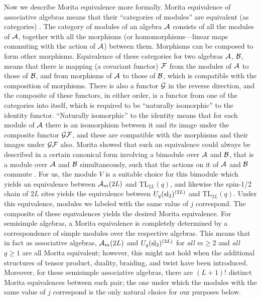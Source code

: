 \documentclass[twocolumn,floats,pra]{revtex4}
\def \cA {{\cal A}}
\begin{document}
Now we describe Morita equivalence more formally. Morita
equivalence of associative algebras means that their ``categories
of modules'' are equivalent (as categories) \cite{anf}. The
category of modules of an algebra $\cA$ consists of all the
modules of $\cA$, together with all the morphisms (or
homomorphisms---linear maps commuting with the action of $\cA$)
between them. Morphisms can be composed to form other morphisms.
Equivalence of these categories for two algebras $\cA$, ${\cal
B}$, means that there is mapping (a covariant functor) ${\cal F}$
from the modules of $\cA$ to those of $\cal B$, and from morphisms
of $\cA$ to those of $\cal B$, which is compatible with the
composition of morphisms. There is also a functor $\cal G$ in the
reverse direction, and the composite of these functors, in either
order, is a functor from one of the categories into itself, which
is required to be ``naturally isomorphic'' to the identity
functor. ``Naturally isomorphic'' to the identity means that for
each module of $\cA$ there is an isomorphism between it and its
image under the composite functor ${\cal G}{\cal F}$, and these
are compatible with the morphisms and their images under ${\cal
G}{\cal F}$ also. Morita showed that such an equivalence could
always be described in a certain canonical form involving a
bimodule over $\cA$ and $\cal B$, that is a module over $\cA$ and
$\cal B$ simultaneously, such that the actions on it of $\cA$ and
$\cal B$ commute \cite{anf}. For us, the module $V$ is a suitable
choice for this bimodule which yields an equivalence between
$\cA_m(2L)$ and TL$_{2L}(q)$, and likewise the spin-1/2 chain of
$2L$ sites yields the equivalence between $U_q({\rm sl}_2)^{(2L)}$
and TL$_{2L}(q)$. Under this equivalence, modules we labeled with
the same value of $j$ correspond. The composite of these
equivalences yields the desired Morita equivalence. For semisimple
algebras, a Morita equivalence is completely determined by a
correspondence of simple modules over the respective algebras.
This means that in fact as associative algebras, $\cA_m(2L)$ and
$U_q({\rm sl}_2)^{(2L)}$ for {\em all} $m\geq 2$ and {\em all}
$q\geq1$ are all Morita equivalent; however, this might not hold
when the additional structures of tensor product, duality,
braiding, and twist have been introduced. Moreover, for these
semisimple associative algebras, there are $(L+1)!$ distinct
Morita equivalences between each pair; the one under which the
modules with the same value of $j$ correspond is the only natural
choice for our purposes below.
\end{document}

